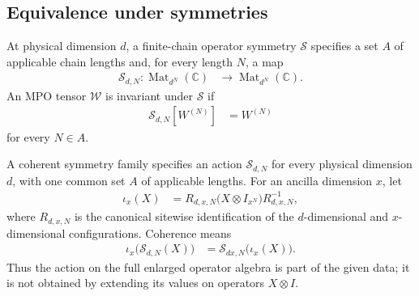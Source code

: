 \subsection{Equivalence under symmetries}

\begin{definition}
    \label{def:mpu_finite_chain_operator_symmetry}
    \leanok
    At physical dimension $d$, a finite-chain operator symmetry $\mathcal S$
    specifies a set $A$ of applicable chain lengths and, for every length $N$,
    a map
    \begin{align}
        \mathcal S_{d,N}\colon
        \operatorname{Mat}_{d^N}(\mathbb C)
         & \longrightarrow \operatorname{Mat}_{d^N}(\mathbb C).
    \end{align}
    An MPO tensor $\mathcal W$ is invariant under $\mathcal S$ if
    \begin{align}
        \mathcal S_{d,N}[W^{(N)}] & =W^{(N)}
    \end{align}
    for every $N\in A$.
\end{definition}

\begin{definition}
    \label{def:mpu_coherent_symmetry_family}
    \leanok
    A coherent symmetry family specifies an action $\mathcal S_{d,N}$ for every
    physical dimension $d$, with one common set $A$ of applicable lengths. For
    an ancilla dimension $x$, let
    \begin{align}
        \iota_x(X)
         & = R_{d,x,N}\bigl(X\otimes I_{x^N}\bigr)R_{d,x,N}^{-1},
    \end{align}
    where $R_{d,x,N}$ is the canonical sitewise identification of the
    $d$-dimensional and $x$-dimensional configurations. Coherence means
    \begin{align}
        \iota_x\bigl(\mathcal S_{d,N}(X)\bigr)
         & = \mathcal S_{dx,N}\bigl(\iota_x(X)\bigr).
    \end{align}
    Thus the action on the full enlarged operator algebra is part of the given data; it
    is not obtained by extending its values on operators $X\otimes I$.
\end{definition}

